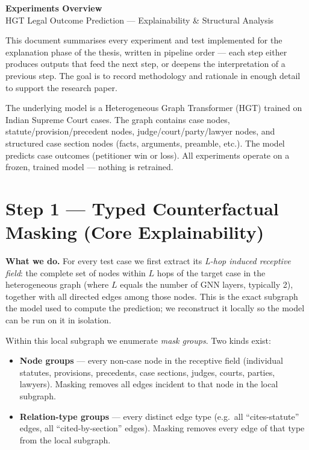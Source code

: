 \documentclass[11pt,a4paper]{article}
\begin{document}
\begin{center}
  {\LARGE \textbf{Experiments Overview}} \\[4pt]
  {\small HGT Legal Outcome Prediction --- Explainability \& Structural Analysis}
\end{center}

\vspace{4pt}

This document summarises every experiment and test implemented for the explanation
phase of the thesis, written in pipeline order --- each step either produces outputs
that feed the next step, or deepens the interpretation of a previous step. The goal
is to record methodology and rationale in enough detail to support the research paper.

The underlying model is a Heterogeneous Graph Transformer (HGT) trained on Indian
Supreme Court cases. The graph contains case nodes, statute/provision/precedent nodes,
judge/court/party/lawyer nodes, and structured case section nodes (facts, arguments,
preamble, etc.). The model predicts case outcomes (petitioner win or loss). All
experiments operate on a frozen, trained model --- nothing is retrained.

\bigskip

\section{Step 1 \texorpdfstring{\textcolor{stepgray}{---}}{---} Typed Counterfactual Masking (Core Explainability)}

\textbf{What we do.}
For every test case we first extract its \emph{L-hop induced receptive field}: the
complete set of nodes within $L$ hops of the target case in the heterogeneous graph
(where $L$ equals the number of GNN layers, typically 2), together with all directed
edges among those nodes. This is the exact subgraph the model used to compute the
prediction; we reconstruct it locally so the model can be run on it in isolation.

Within this local subgraph we enumerate \emph{mask groups}. Two kinds exist:
\begin{itemize}
  \item \textbf{Node groups} --- every non-case node in the receptive field (individual
    statutes, provisions, precedents, case sections, judges, courts, parties, lawyers).
    Masking removes all edges incident to that node in the local subgraph.
  \item \textbf{Relation-type groups} --- every distinct edge type (e.g.\ all
    ``cites-statute'' edges, all ``cited-by-section'' edges). Masking removes every
    edge of that type from the local subgraph.
\end{itemize}
\end{document}
